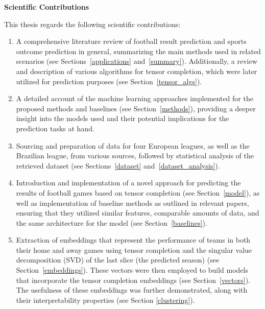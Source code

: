 \documentclass[thesis=M,english]{FITthesis}[2019/12/23]
\begin{document}
{
\begin{shaded*}

\noindent \textbf{Scientific Contributions}

\noindent This thesis regards the following scientific contributions:

\begin{enumerate}[\hspace{20pt}(1)]
    \item A comprehensive literature review of football result prediction and sports outcome prediction in general, summarizing the main methods used in related scenarios (see Sections~\ref{applications} and~\ref{summary}). Additionally, a review and description of various algorithms for tensor completion, which were later utilized for prediction purposes (see Section~\ref{tensor_algs}).

    \item A detailed account of the machine learning approaches implemented for the proposed methods and baselines (see Section~\ref{methods}), providing a deeper insight into the models used and their potential implications for the prediction tasks at hand.
    
    \item Sourcing and preparation of data for four European leagues, as well as the Brazilian league, from various sources, followed by statistical analysis of the retrieved dataset (see Sections~\ref{dataset} and~\ref{dataset_analysis}).

    \item Introduction and implementation of a novel approach for predicting the results of football games based on tensor completion (see Section~\ref{model}), as well as implementation of baseline methods as outlined in relevant papers, ensuring that they utilized similar features, comparable amounts of data, and the same architecture for the model (see Section~\ref{baselines}).

    \item Extraction of embeddings that represent the performance of teams in both their home and away games using tensor completion and the singular value decomposition (SVD) of the last slice (the predicted season) (see Section~\ref{embeddings}). These vectors were then employed to build models that incorporate the tensor completion embeddings (see Section~\ref{vectors}). The usefulness of these embeddings was further demonstrated, along with their interpretability properties (see Section \ref{clustering}).
\end{enumerate}


\end{shaded*}

}
\end{document}
